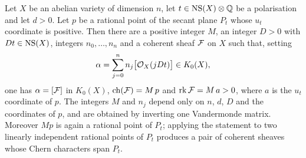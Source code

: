 \begin{theorem}\label{thm:secantexists}
Let $X$ be an abelian variety of dimension $n$, let $t\in\mathrm{NS}(X)\otimes\mathbb{Q}$ be a
polarisation and let $d>0$. Let $p$ be a rational point of the secant plane
$P_{t}$ whose $u_{t}$ coordinate is positive. Then there are a positive
integer $M$, an integer $D>0$ with $Dt\in\mathrm{NS}(X)$, integers $n_{0},\dots,n_{n}$
and a coherent sheaf $\mathcal{F}$ on $X$ such that, setting
\begin{equation}\label{eq:lbwitness}
  \alpha=\sum_{j=0}^{n}n_{j}\bigl[\mathcal{O}_{X}(jDt)\bigr]\in K_{0}(X),
\end{equation}
one has $\alpha=[\mathcal{F}]$ in $K_{0}(X)$, $\operatorname{ch}(\mathcal{F})=M\,p$ and
$\operatorname{rk}\mathcal{F}=M\,a>0$, where $a$ is the $u_{t}$ coordinate of $p$. The integers $M$
and $n_{j}$ depend only on $n$, $d$, $D$ and the coordinates of $p$, and are
obtained by inverting one Vandermonde matrix. Moreover $Mp$ is again a
rational point of $P_{t}$; applying the statement to two linearly independent
rational points of $P_{t}$ produces a pair of coherent sheaves whose Chern
characters span $P_{t}$.
\end{theorem}

